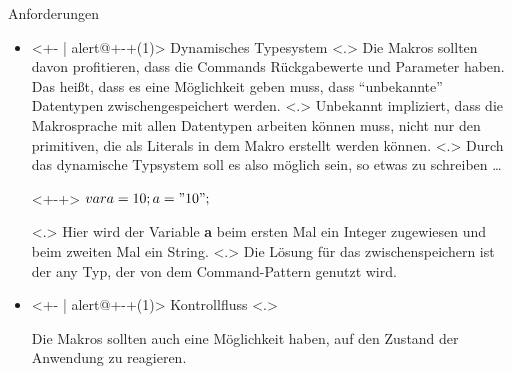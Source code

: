   \begin{frame}{Anforderungen}
    \vspace*{1em}%
    \begin{itemize}
      \item<+- | alert@+-+(1)>
        Dynamisches Typesystem
            \note[item]<.>{
              Die Makros sollten davon profitieren, dass die Commands Rückgabewerte und Parameter haben. Das heißt, dass es eine Möglichkeit geben muss, dass ``unbekannte'' Datentypen zwischengespeichert werden.
            }
            \note[item]<.>{
              Unbekannt impliziert, dass die Makrosprache mit allen Datentypen arbeiten können muss, nicht nur den primitiven, die als Literals in dem Makro erstellt werden können.
            }
            \note[item]<.>{
              Durch das dynamische Typsystem soll es also möglich sein, so etwas zu schreiben \ldots
            }
        \begin{uncoverenv}<+-+>%
          \tabto{4.6cm}
          \myMIn$var a = 10; a = "10";$
        \end{uncoverenv}
            \note[item]<.>{
              Hier wird der Variable \textbf{a} beim ersten Mal ein Integer zugewiesen und beim zweiten Mal ein String.
            }
            \note[item]<.>{
              Die Lösung für das zwischenspeichern ist der any Typ, der von dem Command-Pattern genutzt wird.
            }
      \item<+- | alert@+-+(1)>
        Kontrollfluss
            \note[item]<.>{
              Die Makros sollten auch eine Möglichkeit haben, auf den Zustand der Anwendung zu reagieren.

}
\end{itemize}
\end{frame}
